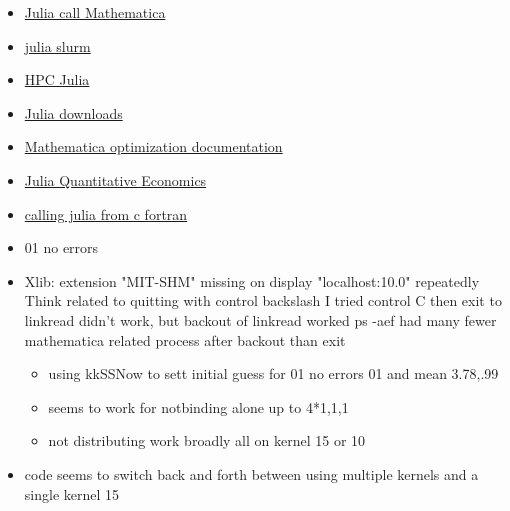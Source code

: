 \documentclass[hyperref]{labbook}
\begin{document}
\begin{itemize}
\item \href{https://github.com/JuliaInterop/Mathematica.jl}{Julia call Mathematica}
\item \href{https://github.com/JuliaParallel/ClusterManagers.jl}{julia slurm}
\item \href{http://ucidatascienceinitiative.github.io/IntroToJulia/Html/HPCJulia}{HPC Julia}
\item \href{http://ucidatascienceinitiative.github.io/IntroToJulia/Html/HPCJulia}{Julia downloads}
\item \href{http://reference.wolfram.com/language/tutorial/ConstrainedOptimizationGlobalNumerical.html}{Mathematica optimization documentation}
\item \href{https://lectures.quantecon.org/jl/getting_started.html}{Julia Quantitative Economics}
\item \href{https://docs.julialang.org/en/stable/manual/embedding/}{calling julia from c fortran}
\end{itemize}


\begin{itemize}
\item 01 no errors
\item Xlib:  extension "MIT-SHM" missing on display "localhost:10.0" repeatedly
Think related to quitting with control backslash  I tried  control C then exit to linkread didn't work, but backout of linkread worked  ps -aef had many fewer mathematica related process after backout than exit
  \begin{itemize}
  \item using kkSSNow to sett initial guess for 01 no errors 01 and mean 3.78,.99
  \item seems to work for notbinding alone up to 4*{1,1,1}
  \item not distributing work broadly all on kernel 15 or 10 
  \end{itemize}

\end{itemize}



\begin{itemize}
\item code seems to switch back and forth between using multiple kernels and a single kernel 15
\end{itemize}


\end{document}
